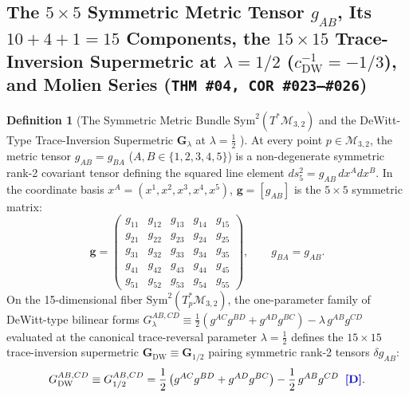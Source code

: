 \documentclass[11pt,a4paper]{article}
\newcommand{\catD}{\text{\textbf{\textcolor{blue!75!black}{[D]}}}}
\theoremstyle{definition}
\newtheorem{definition}[axiom]{Definition}
\theoremstyle{plain}
\theoremstyle{remark}
\begin{document}
\subsection{\texorpdfstring{The $5\times 5$ Symmetric Metric Tensor $g_{AB}$, Its $10 + 4 + 1 = 15$ Components, the $15\times 15$ Trace-Inversion Supermetric at $\lambda = 1/2$ ($c_{\mathrm{DW}}^{-1}=-1/3$), and Molien Series (\texttt{THM~\#04, COR~\#023--\#026})}{The 5x5 Symmetric Metric Tensor g\_AB, Its 10 + 4 + 1 = 15 Components, the 15x15 Trace-Inversion Supermetric at lambda = 1/2, and Molien Series}}

\begin{definition}[The Symmetric Metric Bundle $\mathrm{Sym}^2(T^*\mathcal{M}_{3,2})$ and the DeWitt-Type Trace-Inversion Supermetric $\mathbf{G}_\lambda$ at $\lambda = \frac{1}{2}$ \catD]\label{def:c1_metric_bundle}
At every point $p \in \mathcal{M}_{3,2}$, the metric tensor $g_{AB} = g_{BA}$ ($A,B \in \{1,2,3,4,5\}$) is a non-degenerate symmetric rank-2 covariant tensor defining the squared line element $ds_5^2 = g_{AB}\,dx^A dx^B$. In the coordinate basis $x^A = (x^1, x^2, x^3, x^4, x^5)$, $\mathbf{g} = [g_{AB}]$ is the $5\times 5$ symmetric matrix:
\begin{equation}\label{eq:c1_general_metric_matrix}
\mathbf{g} = \begin{pmatrix}
g_{11} & g_{12} & g_{13} & g_{14} & g_{15} \\
g_{21} & g_{22} & g_{23} & g_{24} & g_{25} \\
g_{31} & g_{32} & g_{33} & g_{34} & g_{35} \\
g_{41} & g_{42} & g_{43} & g_{44} & g_{45} \\
g_{51} & g_{52} & g_{53} & g_{54} & g_{55}
\end{pmatrix}, \qquad g_{BA} = g_{AB}.
\end{equation}
On the 15-dimensional fiber $\mathrm{Sym}^2(T^*_p\mathcal{M}_{3,2})$, the one-parameter family of DeWitt-type bilinear forms \cite{ADM1962} $G_\lambda^{AB,CD} \equiv \frac{1}{2}(g^{AC}g^{BD} + g^{AD}g^{BC}) - \lambda\,g^{AB}g^{CD}$ evaluated at the canonical trace-reversal parameter $\lambda = \frac{1}{2}$ defines the $15\times 15$ trace-inversion supermetric $\mathbf{G}_{\mathrm{DW}} \equiv \mathbf{G}_{1/2}$ pairing symmetric rank-2 tensors $\delta g_{AB}$:
\begin{equation}\label{eq:c1_dewitt_supermetric_def}
G_{\mathrm{DW}}^{AB,CD} \equiv G_{1/2}^{AB,CD} = \frac{1}{2}\left(g^{AC}g^{BD} + g^{AD}g^{BC}\right) - \frac{1}{2}\,g^{AB}g^{CD} \;\;\catD.
\end{equation}
\end{definition}
\end{document}
